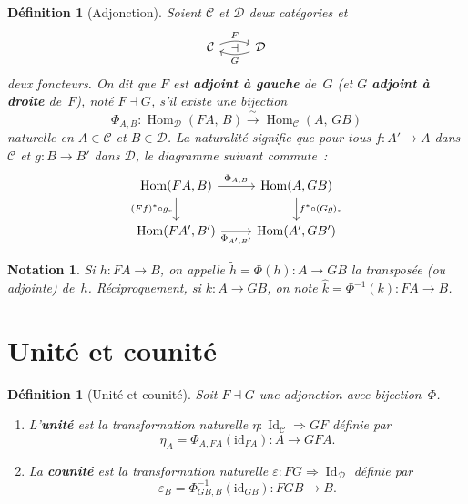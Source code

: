 \documentclass[a4paper,12pt]{book}
\DeclareMathOperator{\Hom}{Hom}
\DeclareMathOperator{\Id}{Id}
\newcommand{\id}{\mathrm{id}}
\newtheorem{definition}[theoreme]{Définition}
\newtheorem*{notation}{Notation}
\begin{document}
\begin{definition}[Adjonction]\label{def:adjonction}
Soient $\mathcal{C}$ et $\mathcal{D}$ deux catégories et
\[
\begin{tikzcd}
\mathcal{C} \arrow[r, bend left=20, "F", ""{name=A,below}]
& \mathcal{D} \arrow[l, bend left=20, "G", ""{name=B,above}]
\arrow[from=A, to=B, phantom, "\dashv"]
\end{tikzcd}
\]
deux foncteurs. On dit que $F$ est \textbf{adjoint à gauche} de~$G$
(et $G$ \textbf{adjoint à droite} de~$F$), noté $F\dashv G$,
s'il existe une bijection
\[
    \Phi_{A,B}\colon \Hom_{\mathcal{D}}(FA,\, B)
    \xrightarrow{\;\sim\;}
    \Hom_{\mathcal{C}}(A,\, GB)
\]
naturelle en $A\in\mathcal{C}$ et $B\in\mathcal{D}$.
La naturalité signifie que pour tous $f\colon A'\to A$ dans $\mathcal{C}$
et $g\colon B\to B'$ dans $\mathcal{D}$, le diagramme suivant commute~:
\[
\begin{tikzcd}
\Hom(FA,B) \arrow[r, "\Phi_{A,B}"] \arrow[d, "{(Ff)^*\circ g_*}"']
& \Hom(A,GB) \arrow[d, "{f^*\circ (Gg)_*}"] \\
\Hom(FA',B') \arrow[r, "\Phi_{A',B'}"']
& \Hom(A',GB')
\end{tikzcd}
\]
\end{definition}

\begin{notation}\label{not:adjonction-transposee}
Si $h\colon FA\to B$, on appelle $\tilde{h}=\Phi(h)\colon A\to GB$
la \emph{transposée} (ou \emph{adjointe}) de~$h$. Réciproquement,
si $k\colon A\to GB$, on note $\hat{k}=\Phi^{-1}(k)\colon FA\to B$.
\end{notation}


\section{Unité et counité}\label{sec:unite-counite}

\begin{definition}[Unité et counité]\label{def:unite-counite}
Soit $F\dashv G$ une adjonction avec bijection~$\Phi$.
\begin{enumerate}[label=(\roman*)]
\item L'\textbf{unité} est la transformation naturelle
$\eta\colon\Id_{\mathcal{C}}\Rightarrow GF$ définie par
\[
    \eta_A = \Phi_{A,FA}(\id_{FA})\colon A\to GFA.
\]
\item La \textbf{counité} est la transformation naturelle
$\varepsilon\colon FG\Rightarrow\Id_{\mathcal{D}}$ définie par
\[
    \varepsilon_B = \Phi^{-1}_{GB,B}(\id_{GB})\colon FGB\to B.
\]
\end{enumerate}
\end{definition}
\end{document}
